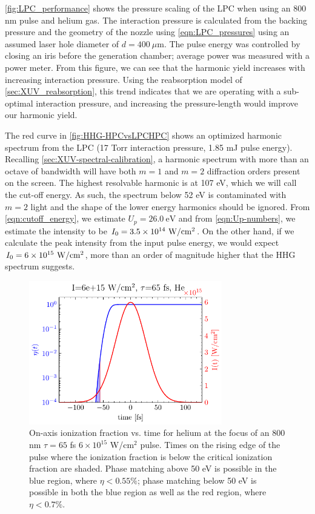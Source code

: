 \cref{fig:LPC_performance} shows the pressure scaling of the LPC when using an 800 nm pulse and helium gas. The interaction pressure is calculated from the backing pressure and the geometry of the nozzle using \cref{eqn:LPC_pressures} using an assumed laser hole diameter of $d = 400 \ \mu$m. The pulse energy was controlled by closing an iris before the generation chamber; average power was measured with a power meter. From this figure, we can see that the harmonic yield increases with increasing interaction pressure. Using the reabsorption model of \cref{sec:XUV_reabsorption}, this trend indicates that we are operating with a sub-optimal interaction pressure, and increasing the pressure-length would improve our harmonic yield.

The red curve in \cref{fig:HHG-HPCvsLPCHPC} shows an optimized harmonic spectrum from the LPC (17 Torr interaction pressure, 1.85 mJ pulse energy). Recalling \cref{sec:XUV-spectral-calibration}, a harmonic spectrum with more than an octave of bandwidth will have both $m=1$ and $m=2$ diffraction orders present on the screen. The highest resolvable harmonic is at 107 eV, which we will call the cut-off energy. As such, the spectrum below 52 eV is contaminated with ${m=2}$ light and the shape of the lower energy harmonics should be ignored. From \cref{eqn:cutoff_energy}, we estimate $U_p = 26.0 \ \textrm{eV}$ and from \cref{eqn:Up-numbers}, we estimate the intensity to be ${I_0 = 3.5 \times 10^{14} \ \textrm{W/cm\textsuperscript{2}}}$. On the other hand, if we calculate the peak intensity from the input pulse energy, we would expect ${I_0 = 6 \times 10^{15} \textrm{ W/cm\textsuperscript{2}}}$, more than an order of magnitude higher that the HHG spectrum suggests.

\begin{figure}
	\centering
	\includegraphics[width=0.75\textwidth]{figures/chap3/eta_vs_t_He800_6e15Wcm2.pdf}
	\caption{On-axis ionization fraction vs. time for helium at the focus of an 800 nm $\tau = 65$ fs $6 \times 10^{15}$ W/cm$^2$ pulse. Times on the rising edge of the pulse where the ionization fraction is below the critical ionization fraction are shaded. Phase matching above 50 eV is possible in the blue region, where $\eta < 0.55\%$; phase matching below 50 eV is possible in both the blue region as well as the red region, where $\eta < 0.7\%$.}
	\label{fig:eta_vs_t_He800_6e15Wcm2}
\end{figure}

